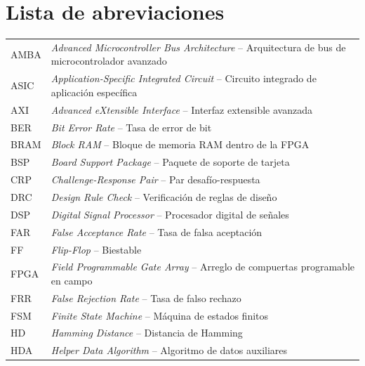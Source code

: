 
\cleardoublepage
{}

\chapter{Lista de abreviaciones}

\begin{longtable}{@{}p{2.2cm}@{}p{\dimexpr\textwidth-2.2cm\relax}@{}}

AMBA   & \textit{Advanced Microcontroller Bus Architecture} -- Arquitectura de bus de microcontrolador avanzado \\[4pt]
ASIC   & \textit{Application-Specific Integrated Circuit} -- Circuito integrado de aplicación específica \\[4pt]
AXI    & \textit{Advanced eXtensible Interface} -- Interfaz extensible avanzada \\[4pt]
BER    & \textit{Bit Error Rate} -- Tasa de error de bit \\[4pt]
BRAM   & \textit{Block RAM} -- Bloque de memoria RAM dentro de la FPGA \\[4pt]
BSP    & \textit{Board Support Package} -- Paquete de soporte de tarjeta \\[4pt]
CRP    & \textit{Challenge-Response Pair} -- Par desafío-respuesta \\[4pt]
DRC    & \textit{Design Rule Check} -- Verificación de reglas de diseño \\[4pt]
DSP    & \textit{Digital Signal Processor} -- Procesador digital de señales \\[4pt]
FAR    & \textit{False Acceptance Rate} -- Tasa de falsa aceptación \\[4pt]
FF     & \textit{Flip-Flop} -- Biestable \\[4pt]
FPGA   & \textit{Field Programmable Gate Array} -- Arreglo de compuertas programable en campo \\[4pt]
FRR    & \textit{False Rejection Rate} -- Tasa de falso rechazo \\[4pt]
FSM    & \textit{Finite State Machine} -- Máquina de estados finitos \\[4pt]
HD     & \textit{Hamming Distance} -- Distancia de Hamming \\[4pt]
HDA    & \textit{Helper Data Algorithm} -- Algoritmo de datos auxiliares \\[4pt]

\end{longtable}
